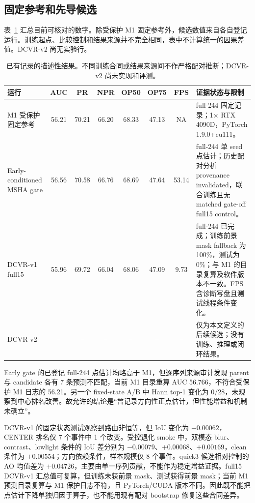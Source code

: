 \documentclass[journal]{IEEEtran}
\begin{document}
\subsection{固定参考和先导候选}
表~\ref{tab:existing} 汇总目前可核对的数字。除受保护 M1 固定参考外，候选数值来自各自登记运行。训练起点、比较控制和结果来源并不完全相同，表中不计算统一的因果差值。DCVR-v2 尚无实验行。
\begin{table}[t]
\centering
\caption{已有记录的描述性结果。不同训练合同或结果来源间不作严格配对推断；DCVR-v2 尚未实现和评测。}
\label{tab:existing}
\small
\begin{tabular}{lccccccp{6.1cm}}
\toprule
运行 & AUC & PR & NPR & OP50 & OP75 & FPS & 证据状态与限制\\
\midrule
M1 受保护固定参考 & 56.21 & 70.21 & 66.20 & 68.33 & 47.13 & NA & full-244 固定记录；1$\times$ RTX 4090D，PyTorch 1.9.0+cu111。\\
Early-conditioned MSHA gate & 56.56 & 70.58 & 66.76 & 68.69 & 47.64 & 53.14 & full-244 单 seed 点估计；历史配对分析 provenance invalidated，联合训练且无 matched gate-off full15 control。\\
DCVR-v1 full15 & 55.96 & 69.72 & 66.04 & 68.06 & 47.09 & 9.73 & full-244 已完成；训练前景 mask fallback 为 100\%，测试为 0\%；与 M1 的目录复算及软件版本不一致。FPS 含诊断写盘且测试线程条件变化。\\
DCVR-v2 & -- & -- & -- & -- & -- & -- & 仅为本文定义的后续候选；没有训练、推理或闭环结果。\\
\bottomrule
\end{tabular}
\end{table}

Early gate 的已登记 full-244 点估计均略高于 M1，但逐序列来源审计发现 parent 与 candidate 各有 7 条预测不匹配，当前 M1 目录重算 AUC 56.766，不符合受保护 M1 日志的 56.21。另一个 fixed-state A/B 中 Hann top-1 变化为 0/28，未观察到中心排名改善。故允许的结论是“曾记录方向性正点估计，但性能增益和机制未确立”。

DCVR-v1 的固定状态测试观察到路由非恒等，但 IoU 变化为 $-0.00062$，CENTER 排名仅 7 个事件中 1 个改变。受控退化 smoke 中，双模态 blur、contrast、lowlight 条件的 IoU 差分别为 $-0.00079$、$+0.00068$、$+0.00169$，clean 条件为 $+0.00554$；方向依赖条件，样本规模仅 8 个事件。quick3 候选相对控制的 AO 均值差为 $+0.04726$，主要由单一序列贡献，不能作为稳定增益证据。full15 DCVR-v1 汇总值可复算，但训练未获前景 mask、测试获得前景 mask；当前 M1 预测目录复算与 M1 保护日志不符，且 PyTorch/CUDA 版本不同。因此既不能把点估计下降单独归因于算子，也不能用现有配对 bootstrap 修复这些合同差异。
\end{document}
